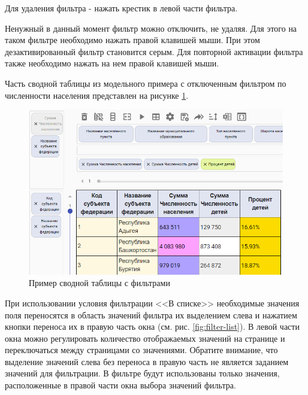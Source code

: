 \documentclass[../user-manual.tex]{subfiles}
\begin{document}
	Для удаления фильтра - нажать крестик в левой части фильтра.
	
	Ненужный в данный момент фильтр можно отключить, не удаляя. Для этого на таком фильтре необходимо нажать правой клавишей мыши. При этом дезактивированный фильтр становится серым. Для повторной активации фильтра также необходимо нажать на нем правой клавишей мыши.
	
	Часть сводной таблицы из модельного примера с отключенным фильтром по численности населения представлен на рисунке \ref{fig:filter-example}.
	
	\begin{figure}[h]
		\centering
		\includegraphics[width=\graphicswidth]{img/22-filter-exam.png}
		\caption{Пример сводной таблицы с фильтрами}
		\label{fig:filter-example}
	\end{figure}
	
	При использовании условия фильтрации <<В списке>> необходимые значения поля переносятся в область значений фильтра их выделением слева и нажатием кнопки переноса их в правую часть окна (см. рис. \ref{fig:filter-list}). В левой части окна можно регулировать количество отображаемых значений на странице и переключаться между страницами со значениями. Обратите внимание, что выделение значений слева без переноса в правую часть не является заданием значений для фильтрации. В фильтре будут использованы только значения, расположенные в правой части окна выбора значений фильтра.
		
\end{document}
